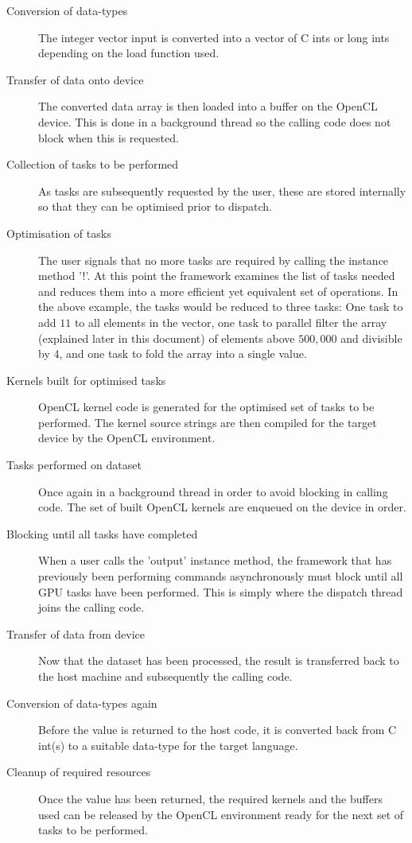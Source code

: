   \begin{description}
    \item[Conversion of data-types]
      The integer vector input is converted into a vector of C ints or long ints depending on the load function used.
    \item[Transfer of data onto device]
      The converted data array is then loaded into a buffer on the OpenCL device. This is done in a background thread so the calling code does not block when this is requested.
    \item[Collection of tasks to be performed]
      As tasks are subsequently requested by the user, these are stored internally so that they can be optimised prior to dispatch.
    \item[Optimisation of tasks]
      The user signals that no more tasks are required by calling the instance method '!'. At this point the framework examines the list of tasks needed and reduces them into a more efficient yet equivalent set of operations. In the above example, the tasks would be reduced to three tasks: One task to add $11$ to all elements in the vector, one task to parallel filter the array (explained later in this document) of elements above $500,000$ and divisible by $4$, and one task to fold the array into a single value.
    \item[Kernels built for optimised tasks]
      OpenCL kernel code is generated for the optimised set of tasks to be performed. The kernel source strings are then compiled for the target device by the OpenCL environment.
    \item[Tasks performed on dataset]
      Once again in a background thread in order to avoid blocking in calling code. The set of built OpenCL kernels are enqueued on the device in order.

    \item[Blocking until all tasks have completed]
      When a user calls the 'output' instance method, the framework that has previously been performing commands asynchronously must block until all GPU tasks have been performed. This is simply where the dispatch thread joins the calling code.
    \item[Transfer of data from device]
      Now that the dataset has been processed, the result is transferred back to the host machine and subsequently the calling code.
    \item[Conversion of data-types again]
      Before the value is returned to the host code, it is converted back from C int(s) to a suitable data-type for the target language.
    \item[Cleanup of required resources]
      Once the value has been returned, the required kernels and the buffers used can be released by the OpenCL environment ready for the next set of tasks to be performed.
  \end{description}

